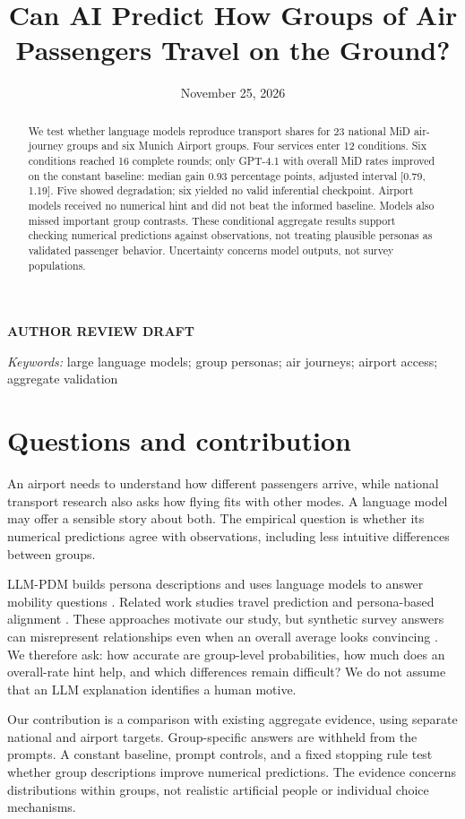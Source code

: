 \documentclass{article}
\title{Can AI Predict How Groups of Air Passengers Travel on the Ground?}
\author{}
\date{November 25, 2026}
\begin{document}
\maketitle
\begin{center}\color{gray}\textbf{AUTHOR REVIEW DRAFT}\end{center}
\begin{abstract}
We test whether language models reproduce transport shares for 23 national MiD air-journey groups and six Munich Airport groups. Four services enter 12 conditions. Six conditions reached 16 complete rounds; only GPT-4.1 with overall MiD rates improved on the constant baseline: median gain 0.93 percentage points, adjusted interval [0.79, 1.19]. Five showed degradation; six yielded no valid inferential checkpoint. Airport models received no numerical hint and did not beat the informed baseline. Models also missed important group contrasts. These conditional aggregate results support checking numerical predictions against observations, not treating plausible personas as validated passenger behavior. Uncertainty concerns model outputs, not survey populations.
\end{abstract}
\textit{Keywords:} large language models; group personas; air journeys; airport access; aggregate validation

\section{Questions and contribution}
An airport needs to understand how different passengers arrive, while national transport research also asks how flying fits with other modes. A language model may offer a sensible story about both. The empirical question is whether its numerical predictions agree with observations, including less intuitive differences between groups.

LLM-PDM builds persona descriptions and uses language models to answer mobility questions \citep{tzachristas2026}. Related work studies travel prediction and persona-based alignment \citep{mo2026,liu2026}. These approaches motivate our study, but synthetic survey answers can misrepresent relationships even when an overall average looks convincing \citep{bisbee2024}. We therefore ask: how accurate are group-level probabilities, how much does an overall-rate hint help, and which differences remain difficult? We do not assume that an LLM explanation identifies a human motive.

Our contribution is a comparison with existing aggregate evidence, using separate national and airport targets. Group-specific answers are withheld from the prompts. A constant baseline, prompt controls, and a fixed stopping rule test whether group descriptions improve numerical predictions. The evidence concerns distributions within groups, not realistic artificial people or individual choice mechanisms.
\end{document}
